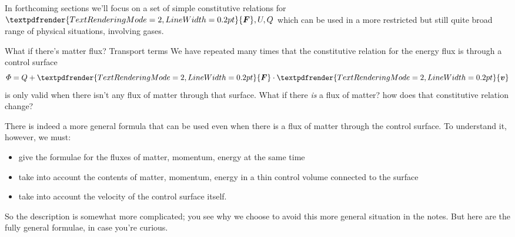 \documentclass[a4paper,12pt,%
onecolumn,oneside,%
british%
]{memoir}
\renewcommand*{\bm}[1]{\textpdfrender{TextRenderingMode=2,LineWidth=0.2pt}{\boldsymbol{#1}}}
\renewcommand*{\|}[1][]{\nonscript\:#1\vert\nonscript\:\mathopen{}}
\newcommand*{\yv}{\bm{v}}
\newcommand*{\yU}{U}
\newcommand*{\yH}{\varPhi}%
\newcommand*{\yQ}{Q}%
\newcommand*{\yF}{\bm{F}}
\begin{document}
In forthcoming sections we'll focus on a set of simple constitutive relations for $\yF,\yU,\yQ$ which can be used in a more restricted but still quite broad range of physical situations, involving gases.

\begin{extra}{What if there's matter flux? Transport terms}\label{ex:energy_matter_flux}
  We have repeated many times that the constitutive relation for the energy flux is through a control surface
  \begin{equation*}
    \yH = \yQ + \yF\cdot\yv
  \end{equation*}
  is only valid when there isn't any flux of matter through that surface. What if there \emph{is} a flux of matter? how does that constitutive relation change?

  There is indeed a more general formula that can be used even when there is a flux of matter through the control surface. To understand it, however, we must:
  \begin{itemize}[nosep]
  \item give the formulae for the fluxes of matter, momentum, energy at the same time
  \item take into account the contents of matter, momentum, energy in a thin control volume connected to the surface
  \item take into account the velocity of the control surface itself.
  \end{itemize}
So the description is somewhat more complicated; you see why we choose to avoid this more general situation in the notes. But here are the fully general formulae, in case you're curious.


\end{extra}
\end{document}
